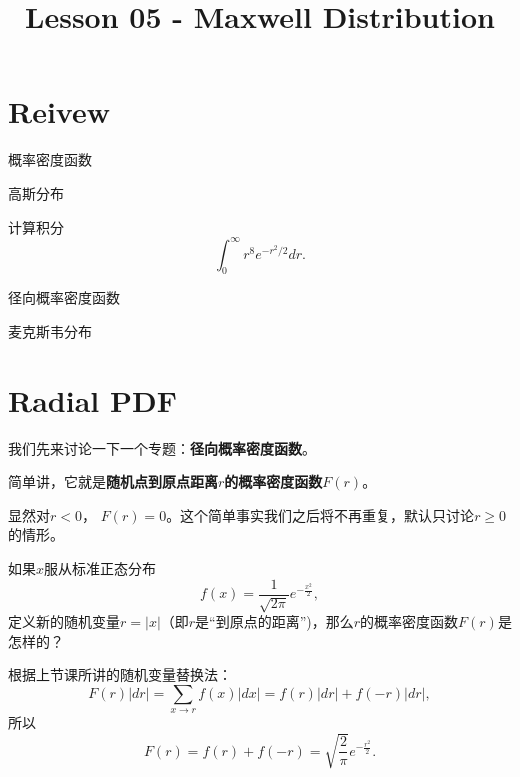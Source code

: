 \documentclass[CJK]{beamer}
\title{Lesson 05 - Maxwell Distribution}
\author{}
\date{}
\begin{document}

\section{Reivew}

\begin{frame}
\bch
{\large
\bitem
\item{概率密度函数}
\item{高斯分布}
\eitem}
\ech
\end{frame}


\begin{frame}
\bch
    {\large

      计算积分
      $$\int_0^\infty r^8e^{-r^2/2}dr. $$
      }
\ech
\end{frame}

\begin{frame}
\bch
\bitem
\item{径向概率密度函数}
\item{麦克斯韦分布}
\eitem
\ech
\end{frame}

\section{Radial PDF}



\begin{frame}
\bch
{\large
  我们先来讨论一下一个专题：{\bf 径向概率密度函数}。

  \skiplines
  
  简单讲，它就是{\bf 随机点到原点距离$r$的概率密度函数$F(r)$}。

  \skiplines

  显然对$r < 0$， $F(r)=0$。这个简单事实我们之后将不再重复，默认只讨论$r\ge 0$的情形。 
}
\ech
\end{frame}


\begin{frame}
\bch
{}
{\large 
  如果$x$服从标准正态分布
  $$f(x) = \frac{1}{\sqrt{2\pi}}e^{-\frac{x^2}{2}},$$
  定义新的随机变量$r=|x|$（即$r$是“到原点的距离”)，那么$r$的概率密度函数$F(r)$是怎样的？}
\ech
\end{frame}


\begin{frame}
\bch
根据上节课所讲的随机变量替换法：
{\large
  $$F(r) |dr| = \sum_{x\rightarrow r} f(x) |dx| = f(r)|dr| + f(-r)|dr|,$$
  所以
  $$F(r) = f(r)+f(-r) = \sqrt{\frac{2}{\pi}}e^{-\frac{r^2}{2}}.$$
}
\ech
\end{frame}
\end{document}
